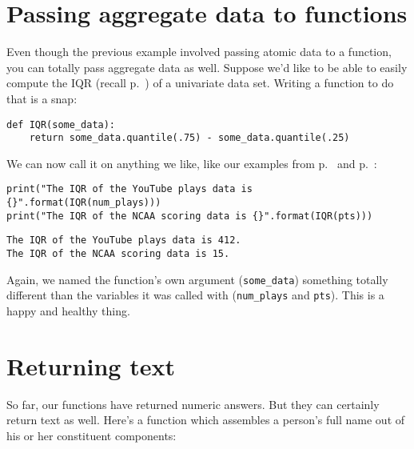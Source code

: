 \section{Passing aggregate data to functions}


Even though the previous example involved passing atomic data to a function,
you can totally pass aggregate data as well. Suppose we'd like to be able to
easily compute the IQR (recall p.~\pageref{IQR}) of a univariate data set.
Writing a function to do that is a snap:

\begin{Verbatim}[fontsize=\small,samepage=true,frame=single,framesep=3mm]
def IQR(some_data):
    return some_data.quantile(.75) - some_data.quantile(.25)
\end{Verbatim}

We can now call it on anything we like, like our examples from
p.~\pageref{YouTubeData} and p.~\pageref{NCAAData}:

\begin{Verbatim}[fontsize=\small,samepage=true,frame=single,framesep=3mm]
print("The IQR of the YouTube plays data is {}".format(IQR(num_plays)))
print("The IQR of the NCAA scoring data is {}".format(IQR(pts)))
\end{Verbatim}
\vspace{-.2in}

\begin{Verbatim}[fontsize=\small,samepage=true,frame=leftline,framesep=5mm,framerule=1mm]
The IQR of the YouTube plays data is 412.
The IQR of the NCAA scoring data is 15.
\end{Verbatim}

Again, we named the function's own argument (\texttt{some\_data}) something
totally different than the variables it was called with (\texttt{num\_plays}
and \texttt{pts}). This is a happy and healthy thing.

\section{Returning text}

So far, our functions have returned numeric answers. But they can certainly
return text as well. Here's a function which assembles a person's full name out
of his or her constituent components:

